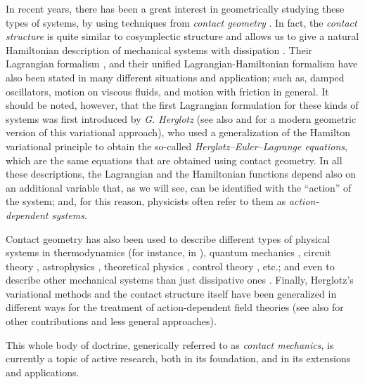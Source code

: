 \documentclass[12pt]{report}
\begin{document}
In recent years, there has been a great interest in geometrically studying these types of systems, by using techniques from {\sl contact geometry} \cite{ABKLR-2012,BHD-2016,BGG-2017,Geiges-2008}.
In fact, the {\sl contact structure} is quite similar to cosymplectic structure and allows us to give
a natural Hamiltonian description of mechanical systems with dissipation
\cite{Bravetti2017,BCT-2017,BLMP-2020,CG-2019,GG-2022,GG-2022b,LL-2018,LIU2018,Vi-2018}.
Their Lagrangian formalism \cite{CIAGLIA2018,DeLeon2019,GGMRR-2019b,GG-2022b},
and their unified Lagrangian-Hamiltonian formalism \cite{LGMMR-2020} have also been stated
in many different situations and application;
such as, damped oscillators, motion on viscous fluids, and  motion with friction in general.
It should be noted, however, that the first Lagrangian formulation for these kinds of systems
was first introduced by {\it G. Herglotz}
\cite{He-1930,Her-1985}
(see also \cite{GeGu2002,LPAF-2018,LIU2018} and \cite{LLM-2020} for a modern geometric version of this variational approach), who used a generalization of the Hamilton variational principle to obtain the
so-called {\sl Herglotz--Euler--Lagrange equations}, which are the same equations that are obtained using contact geometry.
In all these descriptions, the Lagrangian and the Hamiltonian functions depend also on an additional variable that, 
as we will see, can be identified with the ``action'' of the system;
and, for this reason, physicists often refer to them as {\sl action-dependent systems}.

Contact geometry has also been used to describe different types of physical systems
in thermodynamics (for instance, in
\cite{Bravetti2017,Bravetti-2019,SLLM-2019,VS-2021}), 
quantum mechanics \cite{CIAGLIA2018,HW-2018,KA-2013}, circuit theory \cite{CIAGLIA2018,Goto-2016}, astrophysics \cite{GB-2019}, theoretical physics \cite{KA-2013}, control theory \cite{LLM-2020,RMS-2017}, etc.;
and even to describe other mechanical systems than just dissipative ones \cite{LR-2022}.
Finally, Herglotz's variational methods and the contact structure itself have been generalized 
in different ways for the treatment of action-dependent field theories
\cite{LGMRR-2022,GGMRR-2019,GGMRR-2020,GLMR-2022,Vi-2015}
(see also \cite{ACGL-2018,BH-2005,Bo-96,Almeida-2018,Fi2022,Mo-2008,Ri-2022,RSS-2023,TV-2008} for other contributions and less general approaches).

This whole body of doctrine, generically referred to as {\sl contact mechanics}, 
is currently a topic of active research, both in its foundation, and in its extensions and applications.
\end{document}
